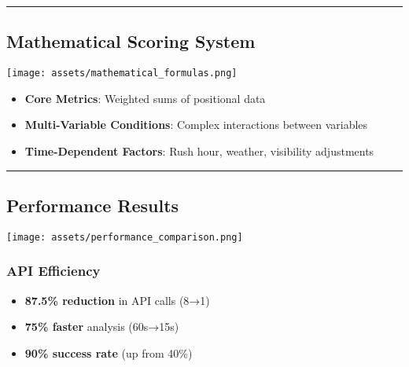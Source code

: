 \documentclass[
  letterpaper,
  DIV=11,
  numbers=noendperiod]{scrartcl}
\providecommand{\tightlist}{%
  \setlength{\itemsep}{0pt}\setlength{\parskip}{0pt}}
\begin{document}
\begin{center}\rule{0.5\linewidth}{0.5pt}\end{center}

\subsection{Mathematical Scoring
System}\label{mathematical-scoring-system}

\begin{center}
\texttt{[image: assets/mathematical\_formulas.png]}
\end{center}

\begin{itemize}
\tightlist
\item
  \textbf{Core Metrics}: Weighted sums of positional data
\item
  \textbf{Multi-Variable Conditions}: Complex interactions between
  variables
\item
  \textbf{Time-Dependent Factors}: Rush hour, weather, visibility
  adjustments
\end{itemize}

\begin{center}\rule{0.5\linewidth}{0.5pt}\end{center}

\subsection{Performance Results}\label{performance-results}

\begin{center}
\texttt{[image: assets/performance\_comparison.png]}
\end{center}

\subsubsection{API Efficiency}\label{api-efficiency}

\begin{itemize}
\tightlist
\item
  \textbf{87.5\% reduction} in API calls (8→1)
\item
  \textbf{75\% faster} analysis (60s→15s)
\item
  \textbf{90\% success rate} (up from 40\%)
\end{itemize}
\end{document}
